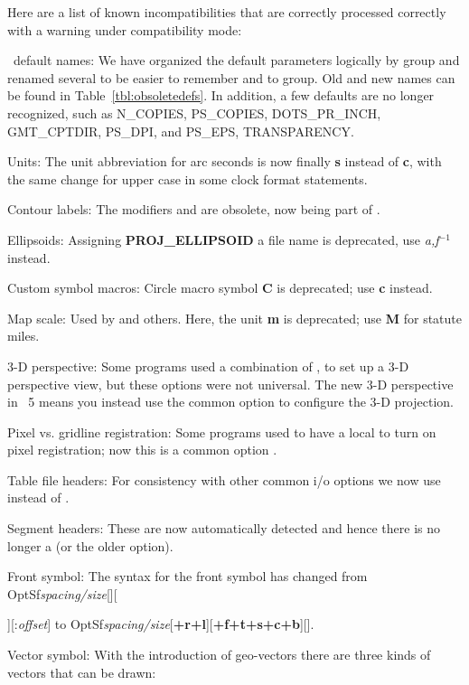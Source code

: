 Here are a list of known incompatibilities that are correctly processed correctly with a warning under
compatibility mode:
\begin{enumerate}
	\item \gmt\ default names: We have organized the default parameters logically by group and
		renamed several to be easier to remember and to group.  Old and new names can be
		found in Table~\ref{tbl:obsoletedefs}.  In addition, a few defaults are no longer
		recognized, such as N\_COPIES, PS\_COPIES, DOTS\_PR\_INCH, GMT\_CPTDIR, PS\_DPI, and PS\_EPS, TRANSPARENCY.
	\item Units: The unit abbreviation for arc seconds is now finally {\bf s} instead of {\bf c},
		with the same change for upper case in some clock format statements.
	\item Contour labels: The modifiers  and  are obsolete, now being part of .
	\item Ellipsoids: Assigning {\bf PROJ\_ELLIPSOID} a file name is deprecated, use {\it a,f$^{-1}$} instead.
	\item Custom symbol macros: Circle macro symbol {\bf C} is deprecated; use {\bf c} instead.
	\item Map scale: Used by  and others.  Here, the unit {\bf m} is deprecated; use {\bf M} for statute miles.
	\item 3-D perspective: Some programs used a combination of ,  to set up a 3-D perspective
		view, but these options were not universal.  The new 3-D perspective in \gmt\ 5 means you
		instead use the common option  to configure the 3-D projection.
	\item Pixel vs. gridline registration: Some programs used to have a local  to turn on pixel registration;
		now this is a common option .
	\item Table file headers: For consistency with other common i/o options we now use  instead of .
	\item Segment headers: These are now automatically detected and hence there is no longer a  (or the older  option).
	\item Front symbol: The syntax for the front symbol has changed from Opt{Sf}{\it spacing/size}[][{][:{\it offset}]
		to Opt{Sf}{\it spacing/size}[{\bf +r+l}][{\bf +f+t+s+c+b}][].
	\item Vector symbol: With the introduction of geo-vectors there are three kinds of vectors that can be drawn:
}
\end{enumerate}
